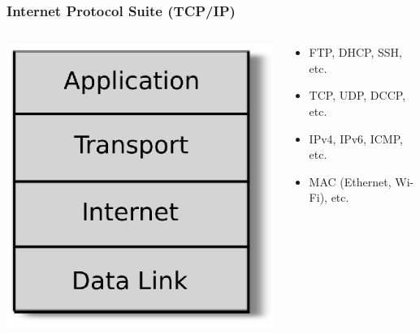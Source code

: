\documentclass{beamer}
\begin{document}
\begin{frame}
  \frametitle{Internet Protocol Suite (TCP/IP)}
\begin{columns}

 \begin{column}{0.3\textwidth}
  \begin{center}
  \includegraphics[scale=0.42]{tcpip_stack}
  \end{center}
  \end{column}

  \begin{column}{0.5\textwidth}
    \begin{itemize}
      \item<1->[Application] FTP, DHCP, SSH, etc.
      \item<2->[Transport] TCP, UDP, DCCP, etc.
      \item<3->[Internet] IPv4, IPv6, {\color{red} ICMP}, etc.
      \item<4->[Data Link]MAC (Ethernet, Wi-Fi), etc.
    \end{itemize}
  \end{column}
\end{columns}

\end{frame}
\end{document}
